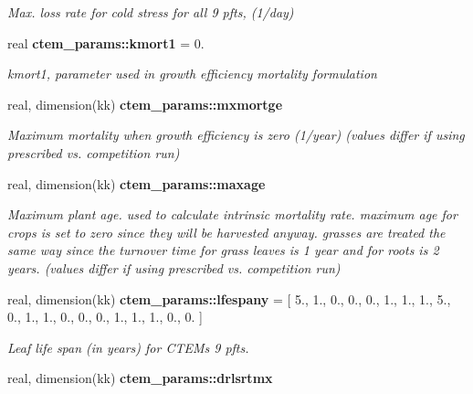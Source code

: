 \begin{DoxyCompactItemize}
\begin{DoxyCompactList}\small\item\em Max. loss rate for cold stress for all 9 pfts, (1/day) \end{DoxyCompactList}\item 
\hypertarget{namespacectem__params_a7847d74c6ea4e5d157002a72f86036c1}{}real {\bfseries ctem\+\_\+params\+::kmort1} = 0.\label{namespacectem__params_a7847d74c6ea4e5d157002a72f86036c1}

\begin{DoxyCompactList}\small\item\em kmort1, parameter used in growth efficiency mortality formulation \end{DoxyCompactList}\item 
\hypertarget{namespacectem__params_aeb439e2ba908efa216016855a3f2b166}{}real, dimension(kk) {\bfseries ctem\+\_\+params\+::mxmortge}\label{namespacectem__params_aeb439e2ba908efa216016855a3f2b166}

\begin{DoxyCompactList}\small\item\em Maximum mortality when growth efficiency is zero (1/year) (values differ if using prescribed vs. competition run) \end{DoxyCompactList}\item 
\hypertarget{namespacectem__params_a90ed5402c77306a5b310717f1201a5d9}{}real, dimension(kk) {\bfseries ctem\+\_\+params\+::maxage}\label{namespacectem__params_a90ed5402c77306a5b310717f1201a5d9}

\begin{DoxyCompactList}\small\item\em Maximum plant age. used to calculate intrinsic mortality rate. maximum age for crops is set to zero since they will be harvested anyway. grasses are treated the same way since the turnover time for grass leaves is 1 year and for roots is 2 years. (values differ if using prescribed vs. competition run) \end{DoxyCompactList}\item 
\hypertarget{namespacectem__params_aa093866c5338fea3488dc5cfdb9449af}{}real, dimension(kk) {\bfseries ctem\+\_\+params\+::lfespany} = \mbox{[} 5., 1., 0., 0., 0., 1., 1., 1., 5., 0., 1., 1., 0., 0., 0., 1., 1., 1., 0., 0. \mbox{]}\label{namespacectem__params_aa093866c5338fea3488dc5cfdb9449af}

\begin{DoxyCompactList}\small\item\em Leaf life span (in years) for C\+T\+E\+M\textquotesingle{}s 9 pfts. \end{DoxyCompactList}\item 
\hypertarget{namespacectem__params_adcdbf5080dbbe4117e28dad60b76a0d9}{}real, dimension(kk) {\bfseries ctem\+\_\+params\+::drlsrtmx}\label{namespacectem__params_adcdbf5080dbbe4117e28dad60b76a0d9}


\end{DoxyCompactItemize}
